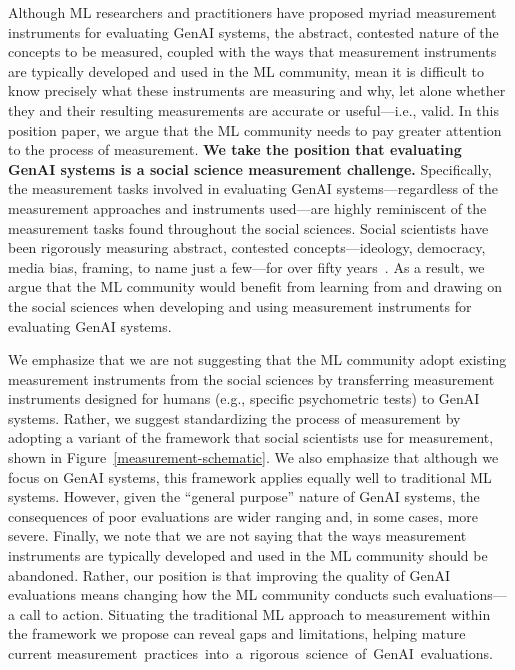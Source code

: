 \documentclass{article}
\begin{document}
Although ML researchers and practitioners have proposed myriad measurement instruments for evaluating GenAI systems, the abstract, contested nature of the concepts to be measured, coupled with the ways that measurement instruments are typically developed and used in the ML community, mean it is difficult to know precisely what these instruments are measuring and why, let alone whether they and their resulting measurements are accurate or useful---i.e., valid. In this position paper, we argue that the ML community needs to pay greater attention to the process of measurement. \textbf{We take the position that evaluating GenAI systems is a social science measurement challenge.} Specifically, the 
measurement tasks involved in evaluating GenAI systems---regardless of the measurement approaches and instruments used---are highly reminiscent of the measurement tasks found throughout the social sciences. Social scientists have been rigorously measuring abstract, contested concepts---ideology, democracy, media bias, framing, to name just a few---for over fifty years~\citep[e.g.,][]{berelson1952content, zaller1992nature}. As a result, we argue that the ML community would benefit from learning from and drawing on the social sciences when developing and using measurement instruments for evaluating GenAI systems.

We emphasize that we are not suggesting that the ML community adopt existing measurement instruments from the social sciences by transferring measurement instruments designed for humans (e.g., specific psychometric tests) to GenAI systems.
Rather, we suggest standardizing the process of measurement by adopting a variant of the framework that social scientists use for measurement, shown in Figure~\ref{measurement-schematic}. We also emphasize that although we focus on GenAI systems, this framework applies equally well to traditional ML systems. However, given the ``general purpose'' nature of GenAI systems, the consequences of poor evaluations are wider ranging and, in some cases, more severe. Finally, we note that we are not saying that the ways measurement instruments are typically developed and used in the ML community should be abandoned. Rather, our position is that improving the quality of GenAI evaluations means changing how the ML community conducts such evaluations---a call to action. Situating the traditional ML approach to measurement within the framework we propose can reveal gaps and limitations, helping mature current measurement~practices~into~a~rigorous~science~of~GenAI~evaluations.
\end{document}
